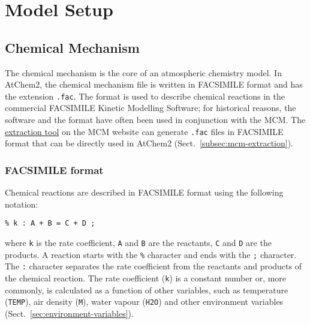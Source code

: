 %
%
%
%

\chapter{Model Setup} \label{ch:setup}

\section{Chemical Mechanism} \label{sec:chemical-mechanism}

The chemical mechanism is the core of an atmospheric chemistry
model. In AtChem2, the chemical mechanism file is written in FACSIMILE
format and has the extension \texttt{.fac}. The format is used to
describe chemical reactions in the commercial FACSIMILE Kinetic
Modelling Software; for historical reasons, the software and the
format have often been used in conjunction with the MCM. The
\href{http://mcm.leeds.ac.uk/MCM/extract.htt}{extraction tool} on the
MCM website can generate \texttt{.fac} files in FACSIMILE format that
can be directly used in AtChem2 (Sect.~\ref{subsec:mcm-extraction}).

\subsection{FACSIMILE format} \label{subsec:facsimile-format}

Chemical reactions are described in FACSIMILE format using the
following notation:

\begin{verbatim}
% k : A + B = C + D ;
\end{verbatim}

where \texttt{k} is the rate coefficient, \texttt{A} and \texttt{B}
are the reactants, \texttt{C} and \texttt{D} are the products. A
reaction starts with the \texttt{\%} character and ends with the
\texttt{;} character. The \texttt{:} character separates the rate
coefficient from the reactants and products of the chemical
reaction. The rate coefficient (\texttt{k}) is a constant number or, more
commonly, is calculated as a function of other variables, such as
temperature (\texttt{TEMP}), air density (\texttt{M}), water vapour
(\texttt{H2O}) and other environment variables
(Sect.~\ref{sec:environment-variables}).


